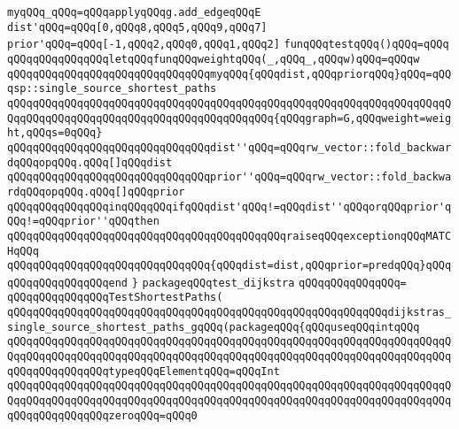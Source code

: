 \verb|myqQQq_qQQq=qQQqapplyqQQqg.add_edgeqQQqE|\newline
\newline
\verb|dist'qQQq=qQQq[0,qQQq8,qQQq5,qQQq9,qQQq7]|\newline
\verb|prior'qQQq=qQQq[-1,qQQq2,qQQq0,qQQq1,qQQq2]|\newline
\newline
\verb|funqQQqtestqQQq()qQQq=qQQq|\newline
\verb|qQQqqQQqqQQqqQQqletqQQqfunqQQqweightqQQq(_,qQQq_,qQQqw)qQQq=qQQqw|\newline
\verb|qQQqqQQqqQQqqQQqqQQqqQQqqQQqqQQqmyqQQq{qQQqdist,qQQqpriorqQQq}qQQq=qQQqsp::single_source_shortest_paths|\newline
\verb|qQQqqQQqqQQqqQQqqQQqqQQqqQQqqQQqqQQqqQQqqQQqqQQqqQQqqQQqqQQqqQQqqQQqqQQqqQQqqQQqqQQqqQQqqQQqqQQqqQQqqQQqqQQqqQQq{qQQqgraph=G,qQQqweight=weight,qQQqs=0qQQq}|\newline
\verb|qQQqqQQqqQQqqQQqqQQqqQQqqQQqqQQqdist''qQQq=qQQqrw_vector::fold_backwardqQQqopqQQq.qQQq[]qQQqdist|\newline
\verb|qQQqqQQqqQQqqQQqqQQqqQQqqQQqqQQqprior''qQQq=qQQqrw_vector::fold_backwardqQQqopqQQq.qQQq[]qQQqprior|\newline
\verb|qQQqqQQqqQQqqQQqinqQQqqQQqifqQQqdist'qQQq!=qQQqdist''qQQqorqQQqprior'qQQq!=qQQqprior''qQQqthen|\newline
\verb|qQQqqQQqqQQqqQQqqQQqqQQqqQQqqQQqqQQqqQQqqQQqraiseqQQqexceptionqQQqMATCHqQQq|\newline
\verb|qQQqqQQqqQQqqQQqqQQqqQQqqQQqqQQq{qQQqdist=dist,qQQqprior=predqQQq}qQQq|\newline
\verb|qQQqqQQqqQQqqQQqend|\newline
\newline
\verb|}|\newline
\newline
\verb|packageqQQqtest_dijkstra|\newline
\verb|qQQqqQQqqQQqqQQq=|\newline
\verb|qQQqqQQqqQQqqQQqTestShortestPaths(|\newline
\verb|qQQqqQQqqQQqqQQqqQQqqQQqqQQqqQQqqQQqqQQqqQQqqQQqqQQqqQQqqQQqdijkstras_single_source_shortest_paths_gqQQq(packageqQQq{qQQquseqQQqintqQQq|\newline
\verb|qQQqqQQqqQQqqQQqqQQqqQQqqQQqqQQqqQQqqQQqqQQqqQQqqQQqqQQqqQQqqQQqqQQqqQQqqQQqqQQqqQQqqQQqqQQqqQQqqQQqqQQqqQQqqQQqqQQqqQQqqQQqqQQqqQQqqQQqqQQqqQQqqQQqqQQqqQQqtypeqQQqElementqQQq=qQQqInt|\newline
\verb|qQQqqQQqqQQqqQQqqQQqqQQqqQQqqQQqqQQqqQQqqQQqqQQqqQQqqQQqqQQqqQQqqQQqqQQqqQQqqQQqqQQqqQQqqQQqqQQqqQQqqQQqqQQqqQQqqQQqqQQqqQQqqQQqqQQqqQQqqQQqqQQqqQQqqQQqqQQqzeroqQQq=qQQq0|\newline
